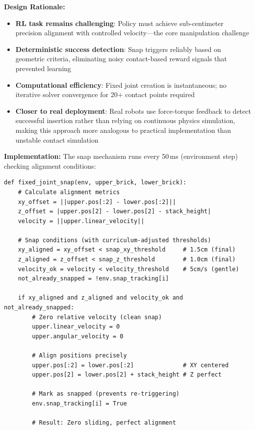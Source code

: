 \documentclass[12pt,a4paper,oneside]{report}
\begin{document}
\textbf{Design Rationale:}
\begin{itemize}
    \item \textbf{RL task remains challenging}: Policy must achieve sub-centimeter precision alignment with controlled velocity---the core manipulation challenge
    \item \textbf{Deterministic success detection}: Snap triggers reliably based on geometric criteria, eliminating noisy contact-based reward signals that prevented learning
    \item \textbf{Computational efficiency}: Fixed joint creation is instantaneous; no iterative solver convergence for 20+ contact points required
    \item \textbf{Closer to real deployment}: Real robots use force-torque feedback to detect successful insertion rather than relying on continuous physics simulation, making this approach more analogous to practical implementation than unstable contact simulation
\end{itemize}


\textbf{Implementation:}
The snap mechanism runs every 50\,ms (environment step) checking alignment conditions:

\begin{lstlisting}
def fixed_joint_snap(env, upper_brick, lower_brick):
    # Calculate alignment metrics
    xy_offset = ||upper.pos[:2] - lower.pos[:2]||
    z_offset = |upper.pos[2] - lower.pos[2] - stack_height|
    velocity = ||upper.linear_velocity||

    # Snap conditions (with curriculum-adjusted thresholds)
    xy_aligned = xy_offset < snap_xy_threshold     # 1.5cm (final)
    z_aligned = z_offset < snap_z_threshold        # 1.0cm (final)
    velocity_ok = velocity < velocity_threshold    # 5cm/s (gentle)
    not_already_snapped = !env.snap_tracking[i]

    if xy_aligned and z_aligned and velocity_ok and not_already_snapped:
        # Zero relative velocity (clean snap)
        upper.linear_velocity = 0
        upper.angular_velocity = 0

        # Align positions precisely
        upper.pos[:2] = lower.pos[:2]              # XY centered
        upper.pos[2] = lower.pos[2] + stack_height # Z perfect

        # Mark as snapped (prevents re-triggering)
        env.snap_tracking[i] = True

        # Result: Zero sliding, perfect alignment
\end{lstlisting}
\end{document}
